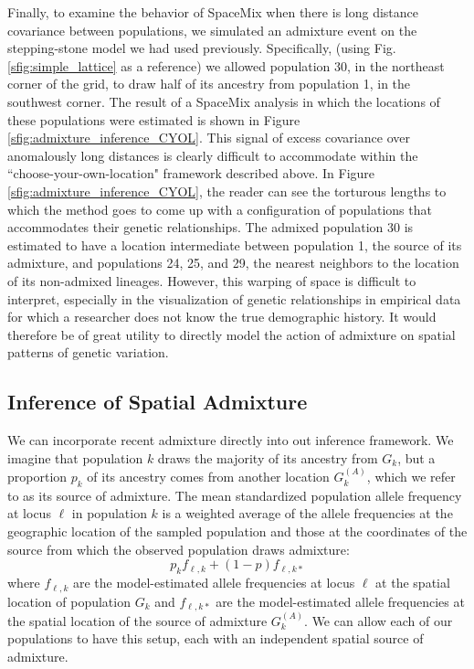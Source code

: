 \documentclass[12pt]{article}
\newcommand{\kadmixsource}[1]{{$G^{(A)}_{#1}$}}
\begin{document}
Finally, to examine the behavior of SpaceMix when there is long distance covariance between populations, we simulated an admixture event on the stepping-stone model we had used previously.  Specifically, (using Fig. \ref{sfig:simple_lattice} as a reference) we allowed population 30, in the northeast corner of the grid, to draw half of its ancestry from population 1, in the southwest corner.  The result of a SpaceMix analysis in which the locations of these populations were estimated is shown in Figure \ref{sfig:admixture_inference_CYOL}.
This signal of excess covariance over anomalously long distances is clearly difficult to accommodate within the ``choose-your-own-location" framework described above.  In Figure \ref{sfig:admixture_inference_CYOL}, the reader can see the torturous lengths to which the method goes to come up with a configuration of populations that accommodates their genetic relationships.  The admixed population 30 is estimated to have a location intermediate between population 1, the source of its admixture, and populations 24, 25, and 29, the nearest neighbors to the location of its non-admixed lineages.  However, this warping of space is difficult to interpret, especially in the visualization of genetic relationships in empirical data for which a researcher does not know the true demographic history.  It would therefore be of great utility to directly model the action of admixture on spatial patterns of genetic variation.

\subsection*{Inference of Spatial Admixture}

We can incorporate recent admixture directly into out inference framework.  We imagine that population $k$ draws the majority of its ancestry from $G_k$, but a proportion $p_k$ of its ancestry comes from another location \kadmixsource{k}, which we refer to as its source of admixture. The mean standardized population allele frequency at locus $\ell$ in population $k$ is a weighted average of the allele frequencies at the geographic location of the sampled population and those at the coordinates of the source from which the observed population draws admixture:
\begin{equation}
p_k f_{\ell,k} + (1-p)f_{\ell,k*} \label{eqn-admixedfreq}
\end{equation}
where $f_{\ell,k}$ are the model-estimated allele frequencies at locus $\ell$ at the spatial location of population $G_k$ and $f_{\ell,k*}$ are the model-estimated allele frequencies at the spatial location of the source of admixture \kadmixsource{k}. We can allow each of our populations to have this setup, each with an independent spatial source of admixture. 
\end{document}
